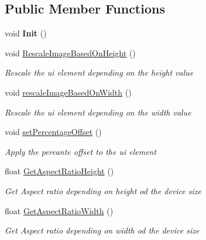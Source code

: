 \subsection*{Public Member Functions}
\begin{DoxyCompactItemize}
\item 
\mbox{\label{class_dr_evil_1_1_visuals_1_1_u_i___graphic___rescaler_a10a56121ca5e03efac5eb4fa24c79817}} 
void {\bfseries Init} ()
\item 
void \mbox{\hyperlink{class_dr_evil_1_1_visuals_1_1_u_i___graphic___rescaler_a6c819e24dee525765ce354f39e0478ea}{Rescale\+Image\+Based\+On\+Height}} ()
\begin{DoxyCompactList}\small\item\em Rescale the ui element depending on the height value \end{DoxyCompactList}\item 
void \mbox{\hyperlink{class_dr_evil_1_1_visuals_1_1_u_i___graphic___rescaler_abb10e3ebe643e7ed763002f246062f3f}{rescale\+Image\+Based\+On\+Width}} ()
\begin{DoxyCompactList}\small\item\em Rescale the ui element depending on the width value \end{DoxyCompactList}\item 
void \mbox{\hyperlink{class_dr_evil_1_1_visuals_1_1_u_i___graphic___rescaler_a8b851fe76ba2a6d41b0b156baa274251}{set\+Percentage\+Offset}} ()
\begin{DoxyCompactList}\small\item\em Apply the percante offset to the ui element \end{DoxyCompactList}\item 
float \mbox{\hyperlink{class_dr_evil_1_1_visuals_1_1_u_i___graphic___rescaler_a5656984c54269ca385bd21e559929fc6}{Get\+Aspect\+Ratio\+Height}} ()
\begin{DoxyCompactList}\small\item\em Get Aspect ratio depending on height od the device size \end{DoxyCompactList}\item 
float \mbox{\hyperlink{class_dr_evil_1_1_visuals_1_1_u_i___graphic___rescaler_a736d14065b635502d82e3a12f23e0a76}{Get\+Aspect\+Ratio\+Width}} ()
\begin{DoxyCompactList}\small\item\em Get Aspect ratio depending on width od the device size \end{DoxyCompactList}\item 

\end{DoxyCompactItemize}
